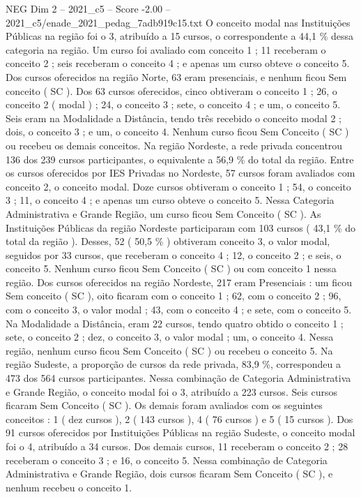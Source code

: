 \begin{textsample}{NEG Dim 2 – 2021\_c5 – Score -2.00 – 2021\_c5/enade\_2021\_pedag\_7adb919c15.txt}
O conceito modal nas Instituições Públicas na região foi o 3, atribuído a 15 cursos, o correspondente a 44,1 \% dessa categoria na região.
Um curso foi avaliado com conceito 1 ; 11 receberam o conceito 2 ; seis receberam o conceito 4 ; e apenas um curso obteve o conceito 5.
Dos cursos oferecidos na região Norte, 63 eram presenciais, e nenhum ficou Sem conceito ( SC ).
Dos 63 cursos oferecidos, cinco obtiveram o conceito 1 ; 26, o conceito 2 ( modal ) ; 24, o conceito 3 ; sete, o conceito 4 ; e um, o conceito 5.
Seis eram na Modalidade a Distância, tendo três recebido o conceito modal 2 ; dois, o conceito 3 ; e um, o conceito 4.
Nenhum curso ficou Sem Conceito ( SC ) ou recebeu os demais conceitos.
Na região Nordeste, a rede privada concentrou 136 dos 239 cursos participantes, o equivalente a 56,9 \% do total da região.
Entre os cursos oferecidos por IES Privadas no Nordeste, 57 cursos foram avaliados com conceito 2, o conceito modal.
Doze cursos obtiveram o conceito 1 ; 54, o conceito 3 ; 11, o conceito 4 ; e apenas um curso obteve o conceito 5.
Nessa Categoria Administrativa e Grande Região, um curso ficou Sem Conceito ( SC ).
As Instituições Públicas da região Nordeste participaram com 103 cursos ( 43,1 \% do total da região ).
Desses, 52 ( 50,5 \% ) obtiveram conceito 3, o valor modal, seguidos por 33 cursos, que receberam o conceito 4 ; 12, o conceito 2 ; e seis, o conceito 5.
Nenhum curso ficou Sem Conceito ( SC ) ou com conceito 1 nessa região.
Dos cursos oferecidos na região Nordeste, 217 eram Presenciais : um ficou Sem conceito ( SC ), oito ficaram com o conceito 1 ; 62, com o conceito 2 ; 96, com o conceito 3, o valor modal ; 43, com o conceito 4 ; e sete, com o conceito 5.
Na Modalidade a Distância, eram 22 cursos, tendo quatro obtido o conceito 1 ; sete, o conceito 2 ; dez, o conceito 3, o valor modal ; um, o conceito 4.
Nessa região, nenhum curso ficou Sem Conceito ( SC ) ou recebeu o conceito 5.
Na região Sudeste, a proporção de cursos da rede privada, 83,9 \%, correspondeu a 473 dos 564 cursos participantes.
Nessa combinação de Categoria Administrativa e Grande Região, o conceito modal foi o 3, atribuído a 223 cursos.
Seis cursos ficaram Sem Conceito ( SC ).
Os demais foram avaliados com os seguintes conceitos : 1 ( dez cursos ), 2 ( 143 cursos ), 4 ( 76 cursos ) e 5 ( 15 cursos ).
Dos 91 cursos oferecidos por Instituições Públicas na região Sudeste, o conceito modal foi o 4, atribuído a 34 cursos.
Dos demais cursos, 11 receberam o conceito 2 ; 28 receberam o conceito 3 ; e 16, o conceito 5.
Nessa combinação de Categoria Administrativa e Grande Região, dois cursos ficaram Sem Conceito ( SC ), e nenhum recebeu o conceito 1.

\end{textsample}
